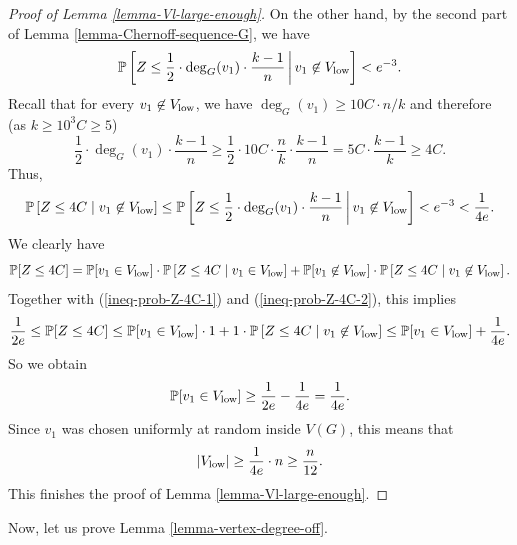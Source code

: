\begin{proof}[Proof of Lemma \ref{lemma-Vl-large-enough}]
On the other hand, by the second part of Lemma \ref{lemma-Chernoff-sequence-G}, we have
\[\mathbb{P}\left[ Z\leq \frac{1}{2}\cdot \deg_G(v_1)\cdot \frac{k-1}{n}\,\bigg\vert\,  v_1\not\in V_{\textnormal{low}}\right]<e^{-3}.\]
Recall that for every $v_1\not\in V_{\textnormal{low}}$, we have $\deg_G(v_1)\geq 10C\cdot n/k$ and therefore (as $k\geq 10^3C\geq 5$)
\[\frac{1}{2}\cdot \deg_G(v_1)\cdot \frac{k-1}{n}\geq \frac{1}{2}\cdot 10C\cdot \frac{n}{k}\cdot \frac{k-1}{n}=5C\cdot \frac{k-1}{k}\geq 4C.\]
Thus,
\begin{equation}\label{ineq-prob-Z-4C-2}
\mathbb{P}\left[ Z\leq 4C\mid v_1\not\in V_{\textnormal{low}}\right]\leq \mathbb{P}\left[ Z\leq \frac{1}{2}\cdot \deg_G(v_1)\cdot \frac{k-1}{n} \,\bigg\vert\,  v_1\not\in V_{\textnormal{low}}\right]<e^{-3}<\frac{1}{4e}.
\end{equation}
We clearly have
\[\mathbb{P}[Z\leq 4C]=\mathbb{P}[v_1\in V_{\textnormal{low}}]\cdot \mathbb{P}\left[ Z\leq 4C\mid v_1\in V_{\textnormal{low}}\right]+\mathbb{P}[v_1\not\in V_{\textnormal{low}}]\cdot \mathbb{P}\left[ Z\leq 4C\mid v_1\not\in V_{\textnormal{low}}\right].\]
Together with (\ref{ineq-prob-Z-4C-1}) and  (\ref{ineq-prob-Z-4C-2}), this implies
\[\frac{1}{2e}\leq \mathbb{P}[Z\leq 4C]\leq \mathbb{P}[v_1\in V_{\textnormal{low}}]\cdot 1+1\cdot \mathbb{P}\left[ Z\leq 4C\mid v_1\not\in V_{\textnormal{low}}\right]\leq \mathbb{P}[v_1\in V_{\textnormal{low}}]+\frac{1}{4e}.\]
So we obtain
\[\mathbb{P}[v_1\in V_{\textnormal{low}}]\geq \frac{1}{2e}-\frac{1}{4e}=\frac{1}{4e}.\]
Since $v_1$ was chosen uniformly at random inside $V(G)$, this means that
\[\vert V_{\textnormal{low}}\vert\geq \frac{1}{4e}\cdot n\geq \frac{n}{12}.\]
This finishes the proof of Lemma \ref{lemma-Vl-large-enough}.\end{proof}

Now, let us prove Lemma \ref{lemma-vertex-degree-off}.

